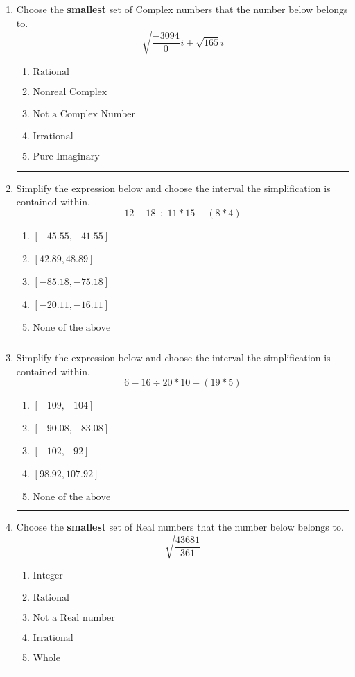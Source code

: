 \documentclass[14pt]{extbook}
\newcommand{\litem}[1]{\item#1\hspace*{-1cm}\rule{\textwidth}{0.4pt}}
\begin{document}
\begin{enumerate}
\litem{
Choose the \textbf{smallest} set of Complex numbers that the number below belongs to.\[ \sqrt{\frac{-3094}{0}} i+\sqrt{165}i \]\begin{enumerate}[label=\Alph*.]
\item \( \text{Rational} \)
\item \( \text{Nonreal Complex} \)
\item \( \text{Not a Complex Number} \)
\item \( \text{Irrational} \)
\item \( \text{Pure Imaginary} \)

\end{enumerate} }
\litem{
Simplify the expression below and choose the interval the simplification is contained within.\[ 12 - 18 \div 11 * 15 - (8 * 4) \]\begin{enumerate}[label=\Alph*.]
\item \( [-45.55, -41.55] \)
\item \( [42.89, 48.89] \)
\item \( [-85.18, -75.18] \)
\item \( [-20.11, -16.11] \)
\item \( \text{None of the above} \)

\end{enumerate} }
\litem{
Simplify the expression below and choose the interval the simplification is contained within.\[ 6 - 16 \div 20 * 10 - (19 * 5) \]\begin{enumerate}[label=\Alph*.]
\item \( [-109, -104] \)
\item \( [-90.08, -83.08] \)
\item \( [-102, -92] \)
\item \( [98.92, 107.92] \)
\item \( \text{None of the above} \)

\end{enumerate} }
\litem{
Choose the \textbf{smallest} set of Real numbers that the number below belongs to.\[ \sqrt{\frac{43681}{361}} \]\begin{enumerate}[label=\Alph*.]
\item \( \text{Integer} \)
\item \( \text{Rational} \)
\item \( \text{Not a Real number} \)
\item \( \text{Irrational} \)
\item \( \text{Whole} \)


\end{enumerate}}
\end{enumerate}
\end{document}
